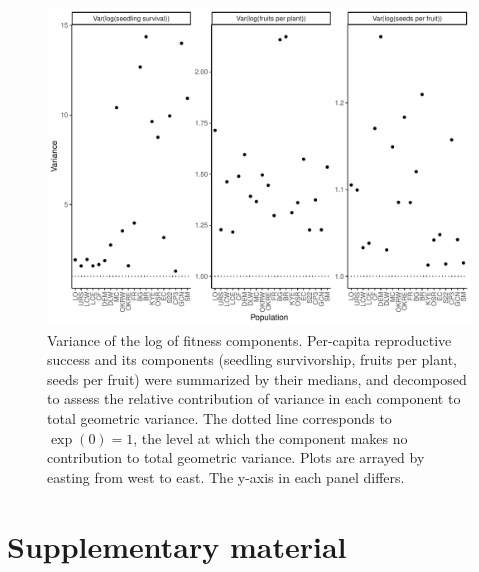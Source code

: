 \documentclass[12pt, oneside, titlepage]{article}   	%
\begin{document}
\begin{figure}[!h]
       \includegraphics[width=\textwidth]{../figures/analysis/variance-decomp.pdf}  
    \caption{ Variance of the log of fitness components. Per-capita reproductive success and its components (seedling survivorship, fruits per plant, seeds per fruit) were summarized by their medians, and decomposed to assess the relative contribution of variance in each component to total geometric variance. The dotted line corresponds to $\exp(0)=1$, the level at which the component makes no contribution to total geometric variance. Plots are arrayed by easting from west to east. The y-axis in each panel differs. }
       \label{fig:variance-decomposition}
\end{figure}

\clearpage
 


\clearpage
\section*{Supplementary material}

\end{document}
